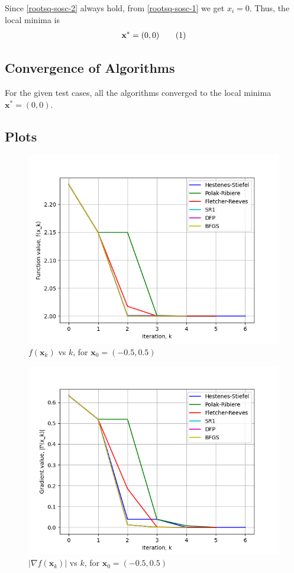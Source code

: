 \documentclass[a4paper]{article}
\newcommand\numberthis{\addtocounter{equation}{1}\tag{\theequation}}
\begin{document}
Since \eqref{rootsq-sosc-2} always hold, from \eqref{rootsq-sosc-1} we get $x_i = 0$. Thus, the local minima is
\begin{align*}
\textbf{x}^* = (0, 0) \numberthis \label{rootsq-minima}
\end{align*}

\subsection{Convergence of Algorithms}

For the given test cases, all the algorithms converged to the local minima $\textbf{x}^* = (0, 0)$.

\subsection{Plots}

\begin{figure}[H]
    \centering
    \includegraphics[width=.65\textwidth]{images/func_1_vals.png}
    \caption{$f(\textbf{x}_k)$ vs $k$, for $\textbf{x}_0 = (-0.5, 0.5)$}
\end{figure}

\begin{figure}[H]
    \centering
    \includegraphics[width=.65\textwidth]{images/func_1_grad.png}
    \caption{$|\nabla f(\textbf{x}_k)|$ vs $k$, for $\textbf{x}_0 = (-0.5, 0.5)$}
\end{figure}
\end{document}
